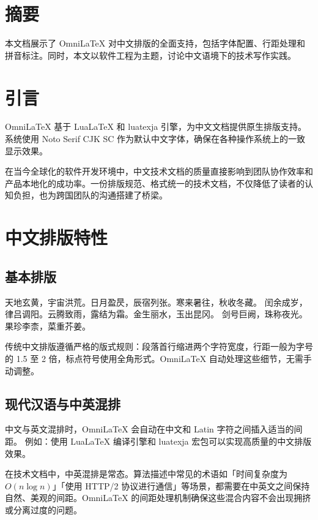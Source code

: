 \documentclass[
    language=chinese,
    doctype=article,
    institution=none,
]{../../omnilatex}
\begin{document}
\maketitle

\section*{摘要}
本文档展示了 OmniLaTeX 对中文排版的全面支持，包括字体配置、行距处理和拼音标注。同时，本文以软件工程为主题，讨论中文语境下的技术写作实践。

\tableofcontents

\section{引言}
OmniLaTeX 基于 LuaLaTeX 和 luatexja 引擎，为中文文档提供原生排版支持。
系统使用 Noto Serif CJK SC 作为默认中文字体，确保在各种操作系统上的一致显示效果。

在当今全球化的软件开发环境中，中文技术文档的质量直接影响到团队协作效率和产品本地化的成功率。一份排版规范、格式统一的技术文档，不仅降低了读者的认知负担，也为跨国团队的沟通搭建了桥梁。

\section{中文排版特性}

\subsection{基本排版}
天地玄黄，宇宙洪荒。日月盈昃，辰宿列张。寒来暑往，秋收冬藏。
闰余成岁，律吕调阳。云腾致雨，露结为霜。金生丽水，玉出昆冈。
剑号巨阙，珠称夜光。果珍李柰，菜重芥姜。

传统中文排版遵循严格的版式规则：段落首行缩进两个字符宽度，行距一般为字号的 1.5 至 2 倍，标点符号使用全角形式。OmniLaTeX 自动处理这些细节，无需手动调整。

\subsection{现代汉语与中英混排}
中文与英文混排时，OmniLaTeX 会自动在中文和 Latin 字符之间插入适当的间距。
例如：使用 LuaLaTeX 编译引擎和 luatexja 宏包可以实现高质量的中文排版效果。

在技术文档中，中英混排是常态。算法描述中常见的术语如「时间复杂度为 $O(n \log n)$」「使用 HTTP/2 协议进行通信」等场景，都需要在中英文之间保持自然、美观的间距。OmniLaTeX 的间距处理机制确保这些混合内容不会出现拥挤或分离过度的问题。
\end{document}
